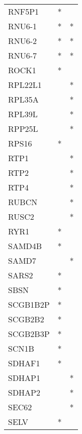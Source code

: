 \begin{longtable}{lcc}
RNF5P1           &              * &            \\
RNU6-1           &              * &          * \\
RNU6-2           &              * &          * \\
RNU6-7           &              * &          * \\
ROCK1            &              * &            \\
RPL22L1          &                &          * \\
RPL35A           &                &          * \\
RPL39L           &                &          * \\
RPP25L           &                &          * \\
RPS16            &              * &            \\
RTP1             &                &          * \\
RTP2             &                &          * \\
RTP4             &                &          * \\
RUBCN            &                &          * \\
RUSC2            &                &          * \\
RYR1             &              * &            \\
SAMD4B           &              * &            \\
SAMD7            &                &          * \\
SARS2            &              * &            \\
SBSN             &              * &            \\
SCGB1B2P         &              * &            \\
SCGB2B2          &              * &            \\
SCGB2B3P         &              * &            \\
SCN1B            &              * &            \\
SDHAF1           &              * &            \\
SDHAP1           &                &          * \\
SDHAP2           &                &          * \\
SEC62            &                &          * \\
SELV             &              * &            \\

\end{longtable}
